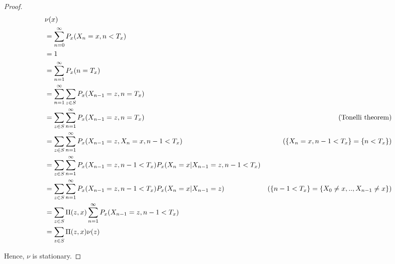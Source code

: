 \documentclass{report}
\begin{document}
\begin{theorem}
\begin{proof}
	\begin{align*}
		&\nu(x) \\
		&= \sum_{n=0}^\infty P_x(X_n=x, n < T_x) \\
		&= 1 \\
		&= \sum_{n=1}^\infty P_x(n = T_x) \\
		&= \sum_{n=1}^\infty \sum_{z \in S} P_x(X_{n-1}=z, n = T_x) \\
		&= \sum_{z \in S} \sum_{n=1}^\infty P_x(X_{n-1}=z, n = T_x) &\text{(Tonelli theorem)}\\
		&= \sum_{z \in S} \sum_{n=1}^\infty P_x(X_{n-1}=z, X_n=x, n-1 < T_x) &\text{($\{X_n=x, n-1 < T_x\} = \{n < T_x\}$)}\\
		&= \sum_{z \in S} \sum_{n=1}^\infty P_x(X_{n-1}=z, n-1 < T_x) P_x(X_n=x | X_{n-1}=z, n-1 < T_x) \\
		&= \sum_{z \in S} \sum_{n=1}^\infty P_x(X_{n-1}=z, n-1 < T_x) P_x(X_n=x | X_{n-1}=z) &\text{($\{n-1 < T_x\} = \{X_0 \neq x, .., X_{n-1} \neq x\}$)}\\
		&= \sum_{z \in S} \Pi(z, x) \sum_{n=1}^\infty P_x(X_{n-1}=z, n-1 < T_x) \\
		&= \sum_{z \in S} \Pi(z, x) \nu(z)
	\end{align*}

	Hence, $\nu$ is stationary.
\end{proof}
\end{theorem}
\end{document}
